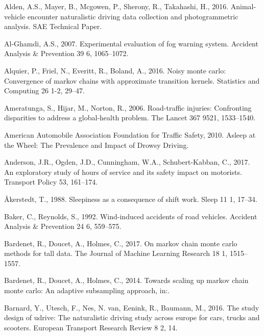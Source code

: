 \documentclass[12pt]{book}
\numberwithin{equation}{chapter}
\begin{document}
\leavevmode\hypertarget{ref-alden2016animal}{}%
Alden, A.S., Mayer, B., Mcgowen, P., Sherony, R., Takahashi, H., 2016. Animal-vehicle encounter naturalistic driving data collection and photogrammetric analysis. SAE Technical Paper.

\leavevmode\hypertarget{ref-al2007experimental}{}%
Al-Ghamdi, A.S., 2007. Experimental evaluation of fog warning system. Accident Analysis \& Prevention 39 6, 1065--1072.

\leavevmode\hypertarget{ref-alquier2016noisy}{}%
Alquier, P., Friel, N., Everitt, R., Boland, A., 2016. Noisy monte carlo: Convergence of markov chains with approximate transition kernels. Statistics and Computing 26 1-2, 29--47.

\leavevmode\hypertarget{ref-ameratunga2006road}{}%
Ameratunga, S., Hijar, M., Norton, R., 2006. Road-traffic injuries: Confronting disparities to address a global-health problem. The Lancet 367 9521, 1533--1540.

\leavevmode\hypertarget{ref-aaafoundation}{}%
American Automobile Association Foundation for Traffic Safety, 2010. Asleep at the Wheel: The Prevalence and Impact of Drowsy Driving.

\leavevmode\hypertarget{ref-anderson2017exploratory}{}%
Anderson, J.R., Ogden, J.D., Cunningham, W.A., Schubert-Kabban, C., 2017. An exploratory study of hours of service and its safety impact on motorists. Transport Policy 53, 161--174.

\leavevmode\hypertarget{ref-aakerstedt1988sleepiness}{}%
Åkerstedt, T., 1988. Sleepiness as a consequence of shift work. Sleep 11 1, 17--34.

\leavevmode\hypertarget{ref-baker1992wind}{}%
Baker, C., Reynolds, S., 1992. Wind-induced accidents of road vehicles. Accident Analysis \& Prevention 24 6, 559--575.

\leavevmode\hypertarget{ref-bardenet2017markov}{}%
Bardenet, R., Doucet, A., Holmes, C., 2017. On markov chain monte carlo methods for tall data. The Journal of Machine Learning Research 18 1, 1515--1557.

\leavevmode\hypertarget{ref-bardenet2014towards}{}%
Bardenet, R., Doucet, A., Holmes, C., 2014. Towards scaling up markov chain monte carlo: An adaptive subsampling approach, in:.

\leavevmode\hypertarget{ref-barnard2016study}{}%
Barnard, Y., Utesch, F., Nes, N. van, Eenink, R., Baumann, M., 2016. The study design of udrive: The naturalistic driving study across europe for cars, trucks and scooters. European Transport Research Review 8 2, 14.
\end{document}
